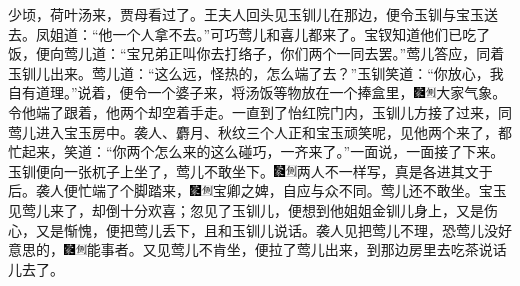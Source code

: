 少顷，荷叶汤来，贾母看过了。王夫人回头见玉钏儿在那边，便令玉钏与宝玉送去。凤姐道：``他一个人拿不去。''可巧莺儿和喜儿都来了。宝钗知道他们已吃了饭，便向莺儿道：``宝兄弟正叫你去打络子，你们两个一同去罢。''莺儿答应，同着玉钏儿出来。莺儿道：``这么远，怪热的，怎么端了去？''玉钏笑道：``你放心，我自有道理。''说着，便令一个婆子来，将汤饭等物放在一个捧盒里，{\includegraphics[width=3mm]{../Images/00006}\includegraphics[width=3mm]{../Images/00011}\footnotesize \kaishu 大家气象。}令他端了跟着，他两个却空着手走。一直到了怡红院门内，玉钏儿方接了过来，同莺儿进入宝玉房中。袭人、麝月、秋纹三个人正和宝玉顽笑呢，见他两个来了，都忙起来，笑道：``你两个怎么来的这么碰巧，一齐来了。''一面说，一面接了下来。玉钏便向一张杌子上坐了，莺儿不敢坐下。{\includegraphics[width=3mm]{../Images/00006}\includegraphics[width=3mm]{../Images/00011}\footnotesize \kaishu 两人不一样写，真是各进其文于后。}袭人便忙端了个脚踏来，{\includegraphics[width=3mm]{../Images/00006}\includegraphics[width=3mm]{../Images/00011}\footnotesize \kaishu 宝卿之婢，自应与众不同。}莺儿还不敢坐。宝玉见莺儿来了，却倒十分欢喜；忽见了玉钏儿，便想到他姐姐金钏儿身上，又是伤心，又是惭愧，便把莺儿丢下，且和玉钏儿说话。袭人见把莺儿不理，恐莺儿没好意思的，{\includegraphics[width=3mm]{../Images/00006}\includegraphics[width=3mm]{../Images/00011}\footnotesize \kaishu 能事者。}又见莺儿不肯坐，便拉了莺儿出来，到那边房里去吃茶说话儿去了。


